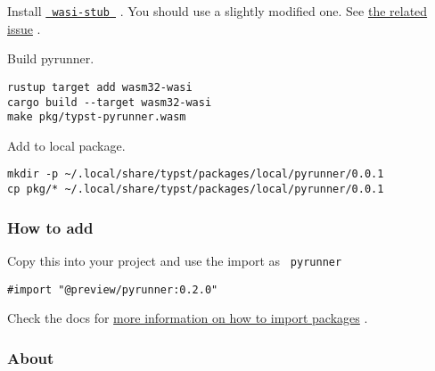 Install
\href{https://github.com/astrale-sharp/wasm-minimal-protocol}{\texttt{\ wasi-stub\ }}
. You should use a slightly modified one. See
\href{https://github.com/astrale-sharp/wasm-minimal-protocol/issues/22\#issuecomment-1827379467}{the
related issue} .

Build pyrunner.

\begin{verbatim}
rustup target add wasm32-wasi
cargo build --target wasm32-wasi
make pkg/typst-pyrunner.wasm
\end{verbatim}

Add to local package.

\begin{verbatim}
mkdir -p ~/.local/share/typst/packages/local/pyrunner/0.0.1
cp pkg/* ~/.local/share/typst/packages/local/pyrunner/0.0.1
\end{verbatim}

\subsubsection{How to add}\label{how-to-add}

Copy this into your project and use the import as \texttt{\ pyrunner\ }

\begin{verbatim}
#import "@preview/pyrunner:0.2.0"
\end{verbatim}



Check the docs for
\href{https://typst.app/docs/reference/scripting/\#packages}{more
information on how to import packages} .

\subsubsection{About}\label{about}

